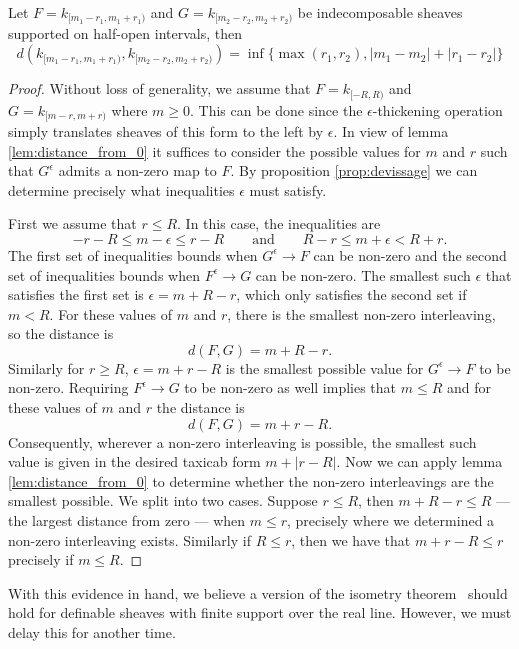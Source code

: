 \begin{lem}
Let $F=k_{[m_1-r_1,m_1+r_1)}$ and $G=k_{[m_2-r_2,m_2+r_2)}$ be indecomposable sheaves supported on half-open intervals, then
\[
 d(k_{[m_1-r_1,m_1+r_1)},k_{[m_2-r_2,m_2+r_2)})=\inf\{\max(r_1,r_2),|m_1-m_2|+|r_1-r_2|\}
\]
\end{lem}
\begin{proof}
Without loss of generality, we assume that $F=k_{[-R,R)}$ and $G=k_{[m-r,m+r)}$ where $m\geq 0$. This can be done since the $\epsilon$-thickening operation simply translates sheaves of this form to the left by $\epsilon$. In view of lemma \ref{lem:distance_from_0} it suffices to consider the possible values for $m$ and $r$ such that $G^{\epsilon}$ admits a non-zero map to $F$. By proposition \ref{prop:devissage} we can determine precisely what inequalities $\epsilon$ must satisfy.

First we assume that $r\leq R$. In this case, the inequalities are
\[
-r-R\leq m-\epsilon \leq r-R \qquad \mathrm{and} \qquad R-r \leq m+\epsilon < R+r.
\]
The first set of inequalities bounds when $G^{\epsilon}\to F$ can be non-zero and the second set of inequalities bounds when $F^{\epsilon}\to G$ can be non-zero. The smallest such $\epsilon$ that satisfies the first set is $\epsilon=m+R-r$, which only satisfies the second set if $m< R$. For these values of $m$ and $r$, there is the smallest non-zero interleaving, so the distance is
\[
d(F,G)=m+R-r.
\]
Similarly for $r\geq R$, $\epsilon=m+r-R$ is the smallest possible value for $G^{\epsilon}\to F$ to be non-zero. Requiring $F^{\epsilon}\to G$ to be non-zero as well implies that $m\leq R$ and for these values of $m$ and $r$ the distance is
\[
d(F,G)=m+r-R.
\]
Consequently, wherever a non-zero interleaving is possible, the smallest such value is given in the desired taxicab form $m+|r-R|$. Now we can apply lemma \ref{lem:distance_from_0} to determine whether the non-zero interleavings are the smallest possible. We split into two cases. Suppose $r\leq R$, then $m+R-r\leq R$ ---  the largest distance from zero --- when $m\leq r$, precisely where we determined a non-zero interleaving exists. Similarly if $R\leq r$, then we have that $m+r-R\leq r$ precisely if $m\leq R$.
\end{proof}

With this evidence in hand, we believe a version of the isometry theorem~\cite{lesnick-thesis,bubenik2012categorification,bauer2013induced} should hold for definable sheaves with finite support over the real line. However, we must delay this for another time.
